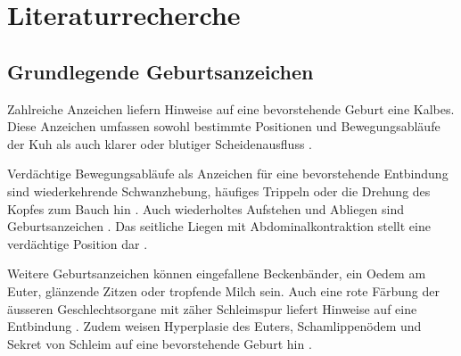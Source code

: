 \section{Literaturrecherche}
\subsection{Grundlegende Geburtsanzeichen}

Zahlreiche Anzeichen liefern Hinweise auf eine bevorstehende Geburt eine Kalbes. Diese Anzeichen umfassen sowohl bestimmte Positionen und Bewegungsabläufe der Kuh als auch klarer oder blutiger Scheidenausfluss \citep[S. 1]{Lange2017}.

Verdächtige Bewegungsabläufe als Anzeichen für eine bevorstehende Entbindung sind wiederkehrende Schwanzhebung, häufiges Trippeln oder die Drehung des Kopfes zum Bauch hin \citep[S. 1]{Lange2017}. Auch wiederholtes Aufstehen und Abliegen sind Geburtsanzeichen \citep[S. 4]{Saint-Dizier2015}. Das seitliche Liegen mit Abdominalkontraktion stellt eine verdächtige Position dar \citep[S. 1]{Lange2017}. 

Weitere Geburtsanzeichen können eingefallene Beckenbänder, ein \gls{Oedem} am Euter, glänzende Zitzen oder tropfende Milch sein. Auch eine rote Färbung der  äusseren Geschlechtsorgane mit zäher Schleimspur liefert Hinweise auf eine Entbindung \citep[S. 6]{Traulsen2013}. Zudem weisen \gls{Hyperplasie} des Euters, Schamlippenödem und \gls{Sekret} von Schleim auf eine bevorstehende Geburt hin \citep[S. 2]{Streyl2011}.

